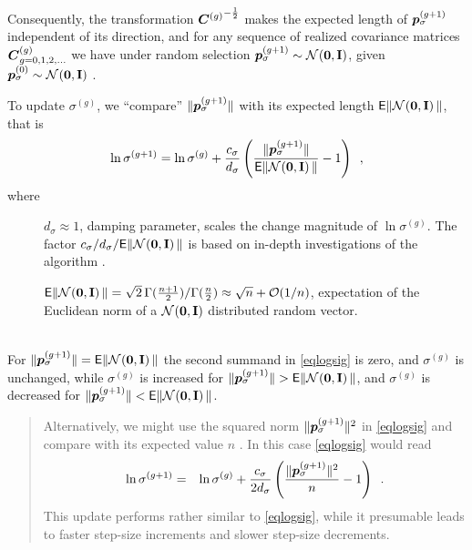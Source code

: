 \documentclass{article} %
\newenvironment{einschub}{%
\begin{small} \begin{quotation}\noindent}{%
  \vspace{0.5ex}\end{quotation}\end{small}%
}
\newcommand{\where}[1]{%
  \begin{description}
  \item[]#1 \vspace{-0.9ex}
  \end{description}
}
\newcommand{\whereende}{\vspace{2ex}~\\}
\newcommand{\ve}[1]{\mathchoice{\mbox{\boldmath$\displaystyle#1$}}
  {\mbox{\boldmath$\textstyle#1$}} {\mbox{\boldmath$\scriptstyle#1$}}
  {\mbox{\boldmath$\scriptscriptstyle#1$}}}
\newcommand{\ma}[1]{\mathchoice{\mbox{\boldmath$\displaystyle#1$}}
  {\mbox{\boldmath$\textstyle#1$}} {\mbox{\boldmath$\scriptstyle#1$}}
  {\mbox{\boldmath$\scriptscriptstyle#1$}}}
\newcommand{\mal}{\cdot}
\newcommand{\N}{\ensuremath{n}}
\newcommand{\rklam}[1]{\left({#1}\right)}
\newcommand{\sig}{\ensuremath{\sigma}}
\newcommand{\sigg}{\sigma^{(g)}}
\newcommand{\siggg}{\sigma^{(g+1)}}
\newcommand{\Cg}{\ensuremath{\ma{C}^{(g)}}}
\newcommand{\cs}{c_\sig}
\newcommand{\ds}{d_\sig}
\newcommand{\ps}{\ve{p}_\sig}
\newcommand{\psgg}{{\ve{p}_\sig^{(g+1)}}}
\newcommand{\Id}{\mathbf{I}}
\newcommand{\NormalNullI}{{\mathcal N}
        \hspace{-0.13em}\left({\ve{0},\Id}\right)}
\newcommand{\chiN}{\mathsf{E}\|\NormalNullI\|}
\renewcommand{\whereende}{\vspace{1ex}~\\}
\renewcommand{\mal}{\times}
\begin{document}
%
Consequently, the transformation ${\Cg}^{-\frac{1}{2}}$ makes the
expected length of $\psgg$ independent of its direction, and for any
sequence of realized covariance matrices $\Cg_{g=0,1,2,\dots}$ we have
under random selection $\psgg\sim\NormalNullI$, given
$\ps^{(0)}\sim\NormalNullI$ \cite{Hansen:1998}.

To update $\sigg$, we ``compare'' $\|\psgg\|$ with its expected length
$\chiN$, that is
%
\begin{equation}\label{eqlogsig}
  \ln\siggg = \ln\sigg +
  \frac{\cs}{\ds}\left(\frac{\|\psgg\|}{\chiN} - 1\right) \enspace,
\end{equation}
where
%
\where{$\ds\approx1$, damping parameter, scales the change magnitude
  of $\ln\sigg$.  The factor $\cs/\ds/\chiN$ is based on in-depth
  investigations of the algorithm \cite{Hansen:1998}. }
%
\where{$\chiN= \sqrt{2}\, \mathrm{\Gamma}(\frac{n+1}{2})
  /\mathrm{\Gamma}(\frac{n}{2})\approx\sqrt{\N}+{\cal O}(1/\N)$,
  expectation of the Euclidean norm of a $\NormalNullI$ distributed
  random vector. } \whereende
%
For $\|\psgg\|=\chiN$ the second summand in \eqref{eqlogsig} is zero,
and $\sigg$ is unchanged, while $\sigg$ is increased for
$\|\psgg\|>\chiN$, and $\sigg$ is decreased for
$\|\psgg\|<\chiN$.
%
\begin{einschub}Alternatively, we might use the squared norm $\|\psgg\|^2$ in
\eqref{eqlogsig} and compare with its expected
value $\N$ \cite{Arnold:2004}. In this case \eqref{eqlogsig} would
read
\begin{eqnarray}
  \ln\siggg 
	&=& \ln\sigg + \frac{\cs}{2\ds}\rklam{\frac{\|\psgg\|^2}{\N}-1}
         \label{eqlogsigsqr} \enspace.
\end{eqnarray}
This update performs rather similar to \eqref{eqlogsig}, while it presumable leads to  faster step-size increments and slower step-size decrements. 
\end{einschub}
\end{document}
